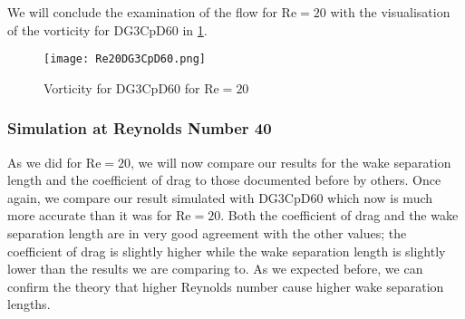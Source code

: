 We will conclude the examination of the flow for $\text{Re} = 20$ with the visualisation of the vorticity for DG3CpD60  in \cref{fig:vorticity20}.
	
\begin{figure}[htp]
	\centering
	\texttt{[image: Re20DG3CpD60.png]}
	\caption{Vorticity for DG3CpD60 for $\text{Re} = 20$}
	\label{fig:vorticity20}
\end{figure}	

	\subsubsection{Simulation at Reynolds Number 40}
	As we did for $\text{Re}=20$, we will now compare our results for the wake separation length and the coefficient of drag to those documented before by others. Once again, we compare our result simulated with DG3CpD60 which now is much more accurate than it was for $\text{Re}=20$. Both the coefficient of drag and the wake separation length are in very good agreement with the other values; the coefficient of drag is slightly higher while the wake separation length is slightly lower than the results we are comparing to. As we expected before, we can confirm the theory that higher Reynolds number cause higher wake separation lengths.
